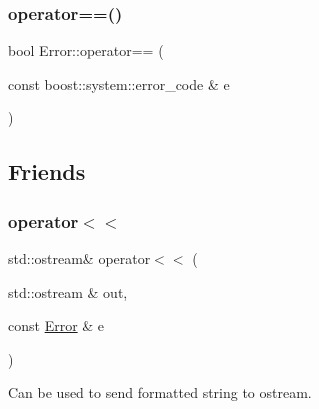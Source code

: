 \mbox{\label{group___syntactic_sugar_ga46d610d78d061c030e562563f947e196}} 
\subsubsection{\texorpdfstring{operator==()}{operator==()}\hspace{0.1cm}{\footnotesize\ttfamily [3/3]}}
{\footnotesize\ttfamily bool Error\+::operator== (\begin{DoxyParamCaption}\item[{const boost\+::system\+::error\+\_\+code \&}]{e }\end{DoxyParamCaption})}



\subsection{Friends}
\mbox{\label{group___syntactic_sugar_ga988539f900b9f29d5444b633f0857347}} 
\subsubsection{\texorpdfstring{operator$<$$<$}{operator<<}}
{\footnotesize\ttfamily std\+::ostream\& operator$<$$<$ (\begin{DoxyParamCaption}\item[{std\+::ostream \&}]{out,  }\item[{const \hyperlink{classshaan97_1_1sync_1_1_error}{Error} \&}]{e }\end{DoxyParamCaption})\hspace{0.3cm}{\ttfamily [friend]}}



Can be used to send formatted string to ostream. 


